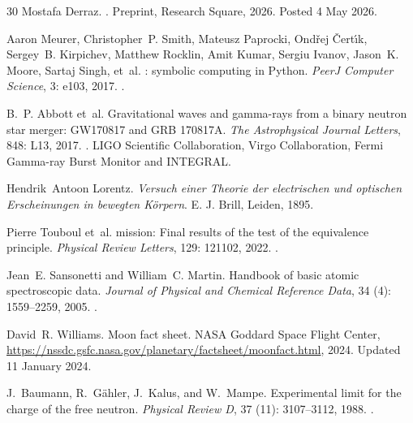 \documentclass[11pt,a4paper]{article}
\theoremstyle{plain}
\theoremstyle{definition}
\theoremstyle{remark}
\begin{document}
\begin{thebibliography}{30}
Mostafa Derraz.
.
\newblock Preprint, Research Square, 2026{}.
\newblock Posted 4 May 2026.

Aaron Meurer, Christopher~P. Smith, Mateusz Paprocki, Ond{\v{r}}ej
  {\v{C}}ert{\'\i}k, Sergey~B. Kirpichev, Matthew Rocklin, Amit Kumar, Sergiu
  Ivanov, Jason~K. Moore, Sartaj Singh, et~al.
: symbolic computing in {Python}.
\newblock \emph{PeerJ Computer Science}, 3: e103, 2017.
\newblock {}.

B.~P. Abbott et~al.
\newblock Gravitational waves and gamma-rays from a binary neutron star merger:
  {GW170817} and {GRB} {170817A}.
\newblock \emph{The Astrophysical Journal Letters}, 848: L13, 2017.
\newblock {}.
\newblock LIGO Scientific Collaboration, Virgo Collaboration, Fermi Gamma-ray
  Burst Monitor and INTEGRAL.

Hendrik~Antoon Lorentz.
\newblock \emph{Versuch einer {T}heorie der electrischen und optischen
  {E}rscheinungen in bewegten {K}{\"o}rpern}.
\newblock E. J. Brill, Leiden, 1895.

Pierre Touboul et~al.
 mission: Final results of the test of the equivalence
  principle.
\newblock \emph{Physical Review Letters}, 129: 121102, 2022.
\newblock {}.

Jean~E. Sansonetti and William~C. Martin.
\newblock Handbook of basic atomic spectroscopic data.
\newblock \emph{Journal of Physical and Chemical Reference Data}, 34
  (4): 1559--2259, 2005.
\newblock {}.

David~R. Williams.
\newblock Moon fact sheet.
\newblock NASA Goddard Space Flight Center,
  \url{https://nssdc.gsfc.nasa.gov/planetary/factsheet/moonfact.html}, 2024.
\newblock Updated 11 January 2024.

J.~Baumann, R.~G{\"a}hler, J.~Kalus, and W.~Mampe.
\newblock Experimental limit for the charge of the free neutron.
\newblock \emph{Physical Review D}, 37 (11): 3107--3112,
  1988.
\newblock {}.


\end{thebibliography}
\end{document}
